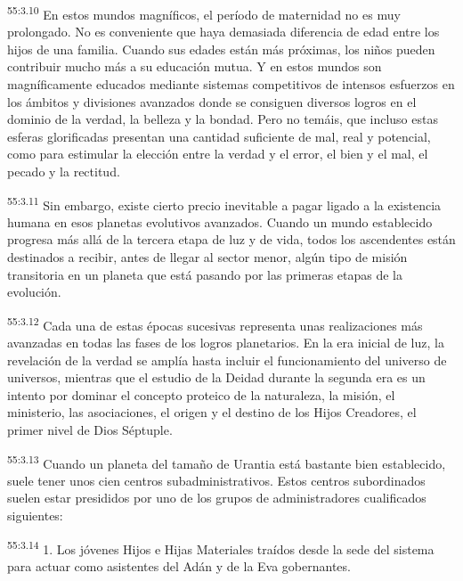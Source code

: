 \par
\textsuperscript{55:3.10} En estos mundos magníficos, el período de maternidad no es muy prolongado. No es conveniente que haya demasiada diferencia de edad entre los hijos de una familia. Cuando sus edades están más próximas, los niños pueden contribuir mucho más a su educación mutua. Y en estos mundos son magníficamente educados mediante sistemas competitivos de intensos esfuerzos en los ámbitos y divisiones avanzados donde se consiguen diversos logros en el dominio de la verdad, la belleza y la bondad. Pero no temáis, que incluso estas esferas glorificadas presentan una cantidad suficiente de mal, real y potencial, como para estimular la elección entre la verdad y el error, el bien y el mal, el pecado y la rectitud.

\par
\textsuperscript{55:3.11} Sin embargo, existe cierto precio inevitable a pagar ligado a la existencia humana en esos planetas evolutivos avanzados. Cuando un mundo establecido progresa más allá de la tercera etapa de luz y de vida, todos los ascendentes están destinados a recibir, antes de llegar al sector menor, algún tipo de misión transitoria en un planeta que está pasando por las primeras etapas de la evolución.

\par
\textsuperscript{55:3.12} Cada una de estas épocas sucesivas representa unas realizaciones más avanzadas en todas las fases de los logros planetarios. En la era inicial de luz, la revelación de la verdad se amplía hasta incluir el funcionamiento del universo de universos, mientras que el estudio de la Deidad durante la segunda era es un intento por dominar el concepto proteico de la naturaleza, la misión, el ministerio, las asociaciones, el origen y el destino de los Hijos Creadores, el primer nivel de Dios Séptuple.

\par
\textsuperscript{55:3.13} Cuando un planeta del tamaño de Urantia está bastante bien establecido, suele tener unos cien centros subadministrativos. Estos centros subordinados suelen estar presididos por uno de los grupos de administradores cualificados siguientes:

\par
\textsuperscript{55:3.14} 1. Los jóvenes Hijos e Hijas Materiales traídos desde la sede del sistema para actuar como asistentes del Adán y de la Eva gobernantes.

